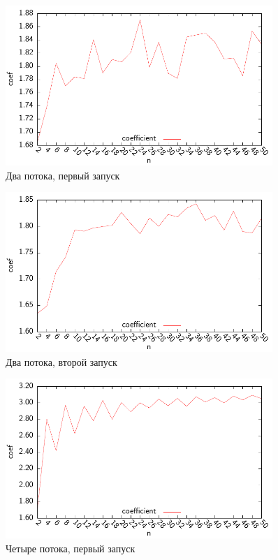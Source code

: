 \documentclass{spisok-article}
\begin{document}
\begin{figure}[h]
    \begin{center}
        \includegraphics[width=0.9\textwidth]{plot_2-1.pdf}
    \end{center}
    \caption{Два потока, первый запуск}\label{fig:two_threads_1}
\end{figure}

\begin{figure}[hp!]
    \begin{center}
        \includegraphics[width=0.9\textwidth]{plot_2-2.pdf}
    \end{center}
    \caption{Два потока, второй запуск}\label{fig:two_threads_2}
\end{figure}

\begin{figure}[hp]
    \begin{center}
        \includegraphics[width=0.9\textwidth]{plot_4-1.pdf}
    \end{center}
    \caption{Четыре потока, первый запуск}\label{fig:four_threads_1}
\end{figure}
\end{document}
